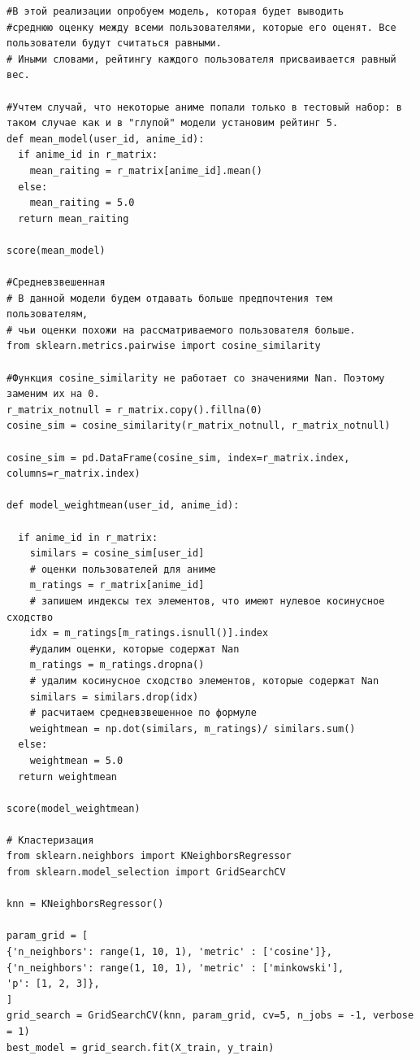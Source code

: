 \documentclass[bachelor, och, diploma]{SCWorks}
\begin{document}
\label{pr1}
\begin{verbatim}
#В этой реализации опробуем модель, которая будет выводить 
#среднюю оценку между всеми пользователями, которые его оценят. Все пользователи будут считаться равными.
# Иными словами, рейтингу каждого пользователя присваивается равный вес.

#Учтем случай, что некоторые аниме попали только в тестовый набор: в таком случае как и в "глупой" модели установим рейтинг 5.
def mean_model(user_id, anime_id):
  if anime_id in r_matrix:
    mean_raiting = r_matrix[anime_id].mean()
  else:
    mean_raiting = 5.0
  return mean_raiting

score(mean_model)

#Средневзвешенная
# В данной модели будем отдавать больше предпочтения тем пользователям,
# чьи оценки похожи на рассматриваемого пользователя больше.
from sklearn.metrics.pairwise import cosine_similarity

#Функция cosine_similarity не работает со значениями Nan. Поэтому заменим их на 0.
r_matrix_notnull = r_matrix.copy().fillna(0)
cosine_sim = cosine_similarity(r_matrix_notnull, r_matrix_notnull)

cosine_sim = pd.DataFrame(cosine_sim, index=r_matrix.index, columns=r_matrix.index)

def model_weightmean(user_id, anime_id):

  if anime_id in r_matrix:
    similars = cosine_sim[user_id]
    # оценки пользователей для аниме
    m_ratings = r_matrix[anime_id]
    # запишем индексы тех элементов, что имеют нулевое косинусное сходство
    idx = m_ratings[m_ratings.isnull()].index
    #удалим оценки, которые содержат Nan
    m_ratings = m_ratings.dropna()
    # удалим косинусное сходство элементов, которые содержат Nan
    similars = similars.drop(idx)
    # расчитаем средневзвешенное по формуле
    weightmean = np.dot(similars, m_ratings)/ similars.sum()
  else:
    weightmean = 5.0
  return weightmean

score(model_weightmean)

# Кластеризация
from sklearn.neighbors import KNeighborsRegressor
from sklearn.model_selection import GridSearchCV

knn = KNeighborsRegressor()

param_grid = [
{'n_neighbors': range(1, 10, 1), 'metric' : ['cosine']},
{'n_neighbors': range(1, 10, 1), 'metric' : ['minkowski'],
'p': [1, 2, 3]},
]
grid_search = GridSearchCV(knn, param_grid, cv=5, n_jobs = -1, verbose = 1)
best_model = grid_search.fit(X_train, y_train)


\end{verbatim}
\end{document}
